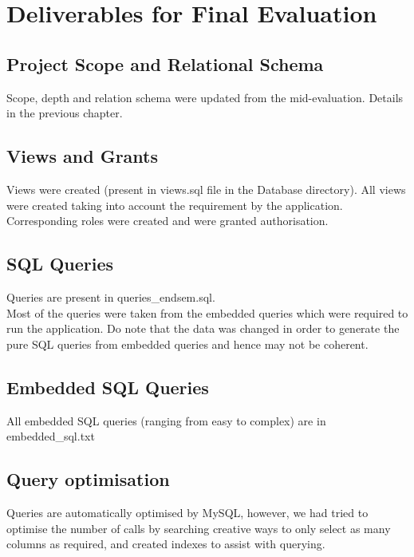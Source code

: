 \documentclass[12pt]{report}
\begin{document}
    
\chapter{Deliverables for Final Evaluation}
    \section{Project Scope and Relational Schema}
        Scope, depth and relation schema were updated from the mid-evaluation. Details in the previous chapter.
    
    \section{Views and Grants}
        Views were created (present in views.sql file in the Database directory). All views were created taking into account the requirement by the application. Corresponding roles were created and were granted authorisation.

    \section{SQL Queries}
        Queries are present in queries\_endsem.sql.\\
        Most of the queries were taken from the embedded queries which were required to run the application. Do note that the data was changed in order to generate the pure SQL queries from embedded queries and hence may not be coherent.

    \section{Embedded SQL Queries}
        All embedded SQL queries (ranging from easy to complex) are in embedded\_sql.txt
    
    \section{Query optimisation}
        Queries are automatically optimised by MySQL, however, we had tried to optimise the number of calls by searching creative ways to only select as many columns as required, and created indexes to assist with querying.
\end{document}
